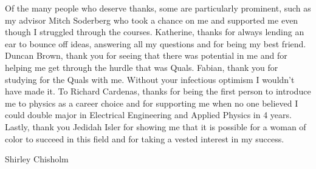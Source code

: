 \begin{acknowledgements}
  Of the many people who deserve thanks, some are particularly prominent,
  such as my advisor Mitch Soderberg who took a chance on me and supported me even though I struggled through the courses. Katherine, thanks for always lending an ear to bounce off ideas, answering all my questions and for being my best friend. Duncan Brown, thank you for seeing that there was potential in me and for helping me get through the hurdle that was Quals. Fabian, thank you for studying for the Quals with me. Without your infectious optimism I wouldn't have made it. To Richard Cardenas, thanks for being the first person to introduce me to physics as a career choice and for supporting me when no one believed I could double major in Electrical Engineering and Applied Physics in 4 years. Lastly, thank you Jedidah Isler for showing me that it is possible for a woman of color to succeed in this field and for taking a vested interest in my success.     
\end{acknowledgements}




{\tableofcontents \let\cleardoublepage\clearpage \listoffigures \let\cleardoublepage\clearpage \listoftables}

%
  {Shirley Chisholm}
\thispagestyle{empty}
